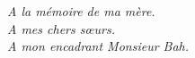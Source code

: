 \cleardoublepage


\begin{acknowledgements}
\begin{flushright}
\emph{
A la mémoire de ma mère.\\
A mes chers sœurs.\\
A mon encadrant Monsieur Bah.
}
\end{flushright}
\end{acknowledgements}
